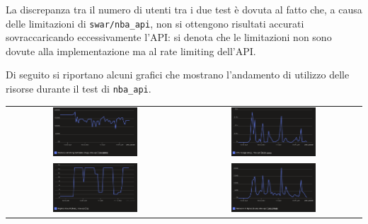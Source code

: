 La discrepanza tra il numero di utenti tra i due test è dovuta al fatto che, a causa delle limitazioni di \texttt{swar/nba\_api}, non si ottengono risultati accurati sovraccaricando eccessivamente l'API: si denota che le limitazioni non sono dovute alla implementazione ma al rate limiting dell'API.

Di seguito si riportano alcuni grafici che mostrano l'andamento di utilizzo delle risorse durante il test di \texttt{nba\_api}.


\begin{tabular}{ c c }
    \includegraphics[width=0.5\textwidth]{img/load_test/nba-api-mem-avg.png} & \includegraphics[width=0.5\textwidth]{img/load_test/nba-api-cpu-avg.png} \\
    \includegraphics[width=0.5\textwidth]{img/load_test/nba-api-rep-count.png} & \includegraphics[width=0.5\textwidth]{img/load_test/nba-api-rx-sum.png} \\
\end{tabular}

